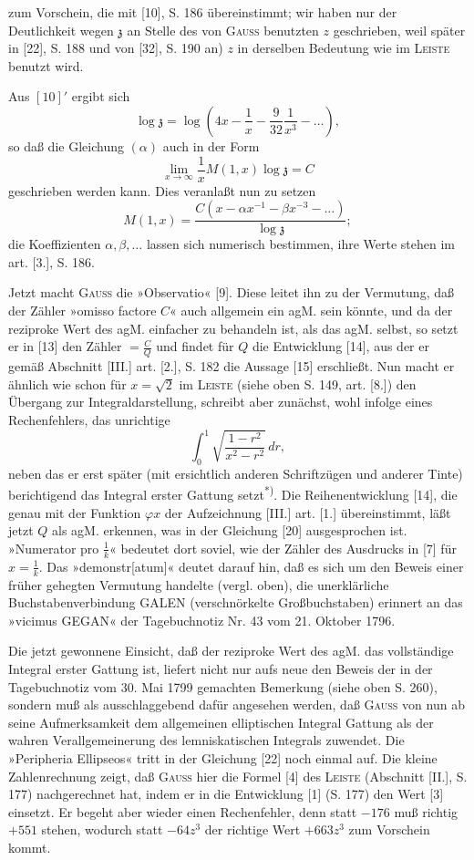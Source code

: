 \noindent zum Vorschein, die mit [10], S. 186 übereinstimmt; wir haben nur der Deutlichkeit wegen $\mathfrak z$ an Stelle des von \textsc{Gauss} benutzten $z$ geschrieben, weil später in [22], S. 188 und von [32], S. 190 an) $z$ in derselben Bedeutung wie im \textsc{Leiste} benutzt wird.
\par\indent Aus $[10]'$ ergibt sich
\[\log\mathfrak z=\log\left(4x-\frac1x-\frac9{32}\frac1{x^3}-\ldots\right),\]
\noindent so daß die Gleichung $(\alpha)$ auch in der Form
\[\lim_{x\to\infty}\frac1xM(1,x)\log\mathfrak z=C\]
\noindent geschrieben werden kann. Dies veranlaßt nun zu setzen
\[M(1,x)=\frac{C(x-\alpha x^{-1}-\beta x^{-3}-\ldots)}{\log\mathfrak z};\]
\noindent die Koeffizienten $\alpha,\beta,\ldots$ lassen sich numerisch bestimmen, ihre Werte stehen im art. [3.], S. 186.
\clearpage
\fancyhead{}
\par\indent Jetzt macht \textsc{Gauss} die »Observatio« [9]. Diese leitet ihn zu der Vermutung, daß der Zähler »omisso factore $C$« auch allgemein ein agM. sein könnte, und da der reziproke Wert des agM. einfacher zu behandeln ist, als das agM. selbst, so setzt er in [13] den Zähler $=\frac CQ$ und findet für $Q$ die Entwicklung [14], aus der er gemäß Abschnitt [III.] art. [2.], S. 182 die Aussage [15] erschließt. Nun macht er ähnlich wie schon für $x=\sqrt2$ im \textsc{Leiste} (siehe oben S. 149, art. [8.]) den Übergang zur Integraldarstellung, schreibt aber zunächst, wohl infolge eines Rechenfehlers, das unrichtige
\[\int_0^1\sqrt{\frac{1-r^2}{x^2-r^2}}\,dr,\]
\noindent neben das er erst später (mit ersichtlich anderen Schriftzügen und anderer Tinte) berichtigend das Integral erster Gattung setzt\textsuperscript{*)}. Die Reihenentwicklung [14], die genau mit der Funktion $\varphi x$ der Aufzeichnung [III.] art. [1.] übereinstimmt, läßt jetzt $Q$ als agM. erkennen, was in der Gleichung [20] ausgesprochen ist. »Numerator pro $\frac1k$« bedeutet dort soviel, wie der Zähler des Ausdrucks in [7] für $x=\frac1k$. Das »demonstr[atum]« deutet darauf hin, daß es sich um den Beweis einer früher gehegten Vermutung handelte (vergl. oben), die unerklärliche Buchstabenverbindung GALEN (verschnörkelte Großbuchstaben) erinnert an das »vicimus GEGAN« der Tagebuchnotiz Nr. 43 vom 21. Oktober 1796.
\par\indent Die jetzt gewonnene  Einsicht, daß der reziproke Wert des agM. das vollständige Integral erster Gattung ist, liefert nicht nur aufs neue den Beweis der in der Tagebuchnotiz vom 30. Mai 1799 gemachten Bemerkung (siehe oben S. 260), sondern muß als ausschlaggebend dafür angesehen werden, daß \textsc{Gauss} von nun ab seine Aufmerksamkeit dem allgemeinen elliptischen Integral  Gattung als der wahren Verallgemeinerung des lemniskatischen Integrals zuwendet. Die »Peripheria Ellipseos« tritt in der Gleichung [22] noch einmal auf. Die kleine Zahlenrechnung zeigt, daß \textsc{Gauss} hier die Formel [4] des \textsc{Leiste} (Abschnitt [II.], S. 177) nachgerechnet hat, indem er in die Entwicklung [1] (S. 177) den Wert [3] einsetzt. Er begeht aber wieder einen Rechenfehler, denn statt $-176$ muß richtig $+551$ stehen, wodurch statt $-64z^3$ der richtige Wert $+663z^3$ zum Vorschein kommt.

